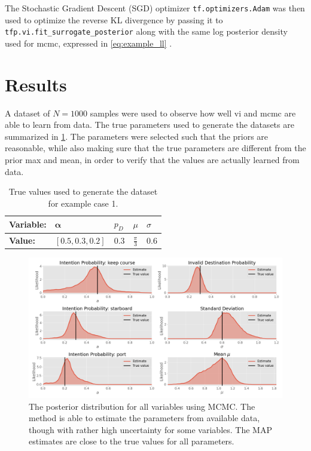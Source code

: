 The Stochastic Gradient Descent (SGD) optimizer \texttt{tf.optimizers.Adam} was then used to optimize the reverse KL divergence by passing it to \texttt{tfp.vi.fit\_surrogate\_posterior} along with the same log posterior density used for \acrshort{mcmc}, expressed in \cref{eq:example_ll} \cite{tensorflow2015-whitepaper}. 

\section{Results}
A dataset of $N=1000$ samples were used to observe how well \acrshort{vi} and \acrshort{mcmc} are able to learn from data. The true parameters used to generate the datasets are summarized in \cref{tbl:example_params}. The parameters were selected such that the priors are reasonable, while also making sure that the true parameters are different from the prior max and mean, in order to verify that the values are actually learned from data. 
\begin{table}[h]
\centering
\begin{tabular}{lllll}
\textbf{Variable:}   & $\boldsymbol{\alpha}$ & $p_D$ & $\mu$                  & $\sigma$         \\ \hline
\textbf{Value:} & $[0.5, 0.3, 0.2]$     & $0.3$ & $\frac{\pi}{3}$ & $0.6$ \\
\end{tabular}
\caption{True values used to generate the dataset for example case 1.}
\label{tbl:example_params}
\end{table}

\begin{figure}[h]
    \centering
    \includegraphics[width=\textwidth]{figures/example_mcmc.png}
    \caption{The posterior distribution for all variables using MCMC. The method is able to estimate the parameters from available data, though with rather high uncertainty for some variables. The MAP estimates are close to the true values for all parameters.}
    \label{fig:example_mcmc_posterior}
\end{figure}

